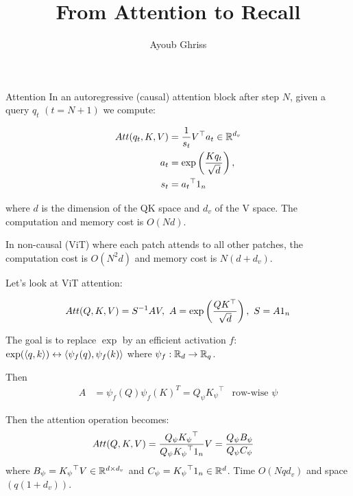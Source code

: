 \documentclass[aspectratio=169]{beamer}
\title{From Attention to Recall}
\author{Ayoub Ghriss}
\begin{document}
\frame{\titlepage}

\begin{frame}{Attention}
	In an autoregressive (causal) attention block after step $N$, given a query $q_t$  $(t=N+1)$ we compute:

	\begin{align*}
		Att(q_t, K, V) & ={\frac{1}{s_t}}V^\top a_t\in\mathbb{R}^{d_v}      \\
		a_t            & = \exp\left(\frac{K q_t}{\sqrt{d}}\right), \\
		s_t            & ={a_t}^\top 1_n
	\end{align*}

	where $d$ is the dimension of the QK space and $d_v$ of the V space. The
	computation and memory cost is $O(Nd)$.

	In non-causal (ViT) where each patch attends to all other patches, the
	computation cost is $O(N^2d)$ and memory cost is $N(d + d_v)$.

\end{frame}
\begin{frame}
	Let's look at ViT attention:

	\begin{align*}
		Att(Q, K, V)  =S^{-1} AV,\ A = \exp\left(\frac{QK^\top}{\sqrt{d}}\right),\ S =A 1_n
	\end{align*}

	The goal is to replace $\exp$ by an efficient activation $f$:
	$\exp(\langle q,k\rangle) \leftrightarrow \langle\psi_f(q),\psi_f(k)\rangle$ where
	$\psi_f:\mathbb{R}_d\to\mathbb{R}_q$.

	Then
	\begin{align*}
		A & = \psi_f(Q) \psi_f(K)^T = Q_\psi {K_\psi}^\top & \text{row-wise } \psi
	\end{align*}

	Then the attention operation becomes:
	\begin{align*}
		Att(Q, K, V) & =\frac{Q_\psi {K_\psi}^\top}{Q_\psi {K_\psi}^\top{1}_{n}} V
		= \frac{Q_\psi B_\psi}{Q_\psi C_\psi}
	\end{align*}
	where $B_\psi={K_\psi}^\top V \in \mathbb{R}^{d\times d_v}$ and $C_\psi={K_\psi}^\top{1}_{n} \in\mathbb{R}^d$.
	Time $O(N q d_v)$ and space $(q(1+d_v))$.
\end{frame}
\end{document}
